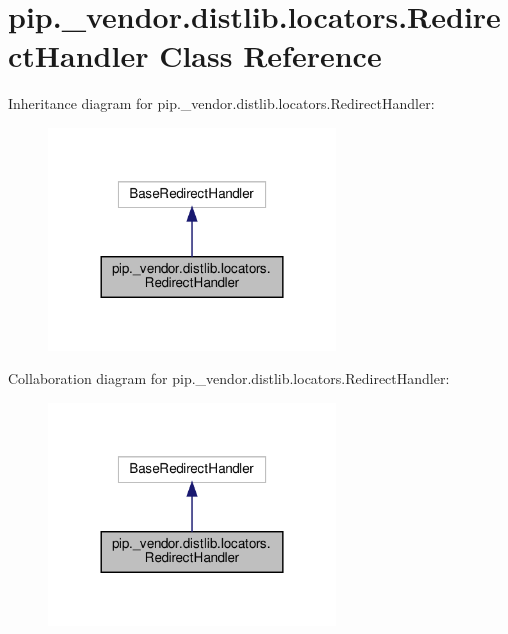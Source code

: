 \hypertarget{classpip_1_1__vendor_1_1distlib_1_1locators_1_1RedirectHandler}{}\section{pip.\+\_\+vendor.\+distlib.\+locators.\+Redirect\+Handler Class Reference}
\label{classpip_1_1__vendor_1_1distlib_1_1locators_1_1RedirectHandler}


Inheritance diagram for pip.\+\_\+vendor.\+distlib.\+locators.\+Redirect\+Handler\+:
\nopagebreak
\begin{figure}[H]
\begin{center}
\leavevmode
\includegraphics[width=216pt]{classpip_1_1__vendor_1_1distlib_1_1locators_1_1RedirectHandler__inherit__graph}
\end{center}
\end{figure}


Collaboration diagram for pip.\+\_\+vendor.\+distlib.\+locators.\+Redirect\+Handler\+:
\nopagebreak
\begin{figure}[H]
\begin{center}
\leavevmode
\includegraphics[width=216pt]{classpip_1_1__vendor_1_1distlib_1_1locators_1_1RedirectHandler__coll__graph}
\end{center}
\end{figure}
